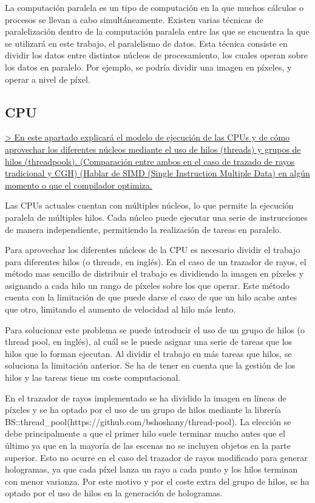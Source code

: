 \documentclass[10pt, a4paper]{article}
\begin{document}
La computación paralela es un tipo de computación en la que muchos cálculos o procesos se llevan a cabo simultáneamente. Existen varias técnicas de paralelización dentro de la computación paralela entre las que se encuentra la que se utilizará en este trabajo, el paralelismo de datos. Esta técnica consiste en dividir los datos entre distintos núcleos de procesamiento, los cuales operan sobre los datos en paralelo. Por ejemplo, se podría dividir una imagen en píxeles, y operar a nivel de píxel.

\subsection{CPU}

\underline{> En este apartado explicará el modelo de ejecución de las CPUs y de cómo aprovechar los diferentes núcleos mediante el uso de hilos (threads) y grupos de hilos (threadpools). (Comparación entre ambos en el caso de trazado de rayos tradicional y CGH) (Hablar de SIMD (Single Instruction Multiple Data) en algún momento o que el compilador optimiza.}

Las CPUs actuales cuentan con múltiples núcleos, lo que permite la ejecución paralela de múltiples hilos. Cada núcleo puede ejecutar una serie de instrucciones de manera independiente, permitiendo la realización de tareas en paralelo.

Para aprovechar los diferentes núcleos de la CPU es necesario dividir el trabajo para diferentes hilos (o threads, en inglés). En el caso de un trazador de rayos, el método mas sencillo de distribuir el trabajo es dividiendo la imagen en píxeles y asignando a cada hilo un rango de píxeles sobre los que operar. Este método cuenta con la limitación de que puede darse el caso de que un hilo acabe antes que otro, limitando el aumento de velocidad al hilo más lento. 

Para solucionar este problema se puede introducir el uso de un grupo de hilos (o thread pool, en inglés), al cuál se le puede asignar una serie de tareas que los hilos que lo forman ejecutan. Al dividir el trabajo en más tareas que hilos, se soluciona la limitación anterior. Se ha de tener en cuenta que la gestión de los hilos y las tareas tiene un coste computacional.

En el trazador de rayos implementado se ha dividido la imagen en líneas de píxeles y se ha optado por el uso de un grupo de hilos mediante la librería BS::thread_pool(https://github.com/bshoshany/thread-pool). La elección se debe principalmente a que el primer hilo suele terminar mucho antes que el último ya que en la mayoría de las escenas no se incluyen objetos en la parte superior. Esto no ocurre en el caso del trazador de rayos modificado para generar hologramas, ya que cada píxel lanza un rayo a cada punto y los hilos terminan con menor varianza. Por este motivo y por el coste extra del grupo de hilos, se ha optado por el uso de hilos en la generación de hologramas.
\end{document}
